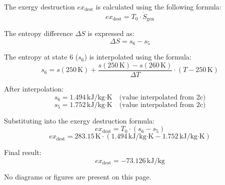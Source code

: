 The exergy destruction \( ex_{\text{dest}} \) is calculated using the following formula:  
\[
ex_{\text{dest}} = T_0 \cdot \dot{S}_{\text{gen}}
\]  

The entropy difference \( \Delta S \) is expressed as:  
\[
\Delta S = s_6 - s_5
\]  

The entropy at state 6 (\( s_6 \)) is interpolated using the formula:  
\[
s_6 = s(250 \, \text{K}) + \frac{s(250 \, \text{K}) - s(260 \, \text{K})}{\Delta T} \cdot (T - 250 \, \text{K})
\]  

After interpolation:  
\[
s_6 = 1.494 \, \text{kJ/kg·K} \quad \text{(value interpolated from 2c)}
\]  
\[
s_5 = 1.752 \, \text{kJ/kg·K} \quad \text{(value interpolated from 2c)}
\]  

Substituting into the exergy destruction formula:  
\[
ex_{\text{dest}} = T_0 \cdot (s_6 - s_5)
\]  
\[
ex_{\text{dest}} = 283.15 \, \text{K} \cdot (1.494 \, \text{kJ/kg·K} - 1.752 \, \text{kJ/kg·K})
\]  

Final result:  
\[
ex_{\text{dest}} = -73.126 \, \text{kJ/kg}
\]  

No diagrams or figures are present on this page.